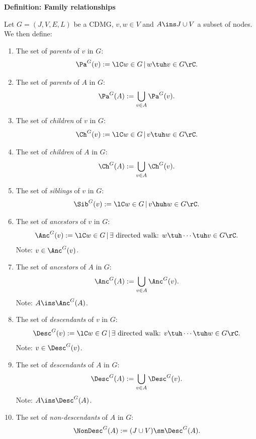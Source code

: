 \vspace{\appendixNotesGap}

\noindent\textbf{Definition: Family relationships}\par\smallskip
{\appendixTexSize
     Let $G=(J,V,E,L)$ be a CDMG, $v,w \in V$ and $A \ins J \cup V$ a subset of nodes.
     We then define:
     \begin{enumerate}
         \item The set of \emph{parents} of $v$ in $G$: \[\Pa^G(v):=\lC w \in G\,|\, w \tuh v \in G \rC.\]
         \item[] The set of \emph{parents} of $A$ in $G$: \[\Pa^G(A):= \bigcup_{v \in A} \Pa^G(v).\]
         \item The set of \emph{children} of $v$ in $G$: \[\Ch^G(v):=\lC w \in G\,|\, v \tuh w \in G \rC.\]
         \item[] The set of \emph{children} of $A$ in $G$: \[\Ch^G(A):= \bigcup_{v \in A} \Ch^G(v).\]
         \item The set of \emph{siblings} of $v$ in $G$: \[\Sib^G(v):=\lC w \in G\,|\, v \huh w \in G \rC.\]
         \item The set of \emph{ancestors} of $v$ in $G$: 
             \[\Anc^G(v):=\lC w \in G\,|\,\exists \text{ directed walk: } w \tuh \cdots \tuh v \in G \rC.\]
             Note: $v \in \Anc^G(v)$.
         \item[] The set of \emph{ancestors} of $A$ in $G$: \[\Anc^G(A):= \bigcup_{v \in A} \Anc^G(v).\]
             Note: $A \ins \Anc^G(A)$.
         \item The set of \emph{descendants} of $v$ in $G$: 
             \[\Desc^G(v):=\lC w \in G\,|\,\exists \text{ directed walk: } v \tuh \cdots \tuh w \in G \rC.\]
             Note: $v \in \Desc^G(v)$.
         \item[] The set of \emph{descendants} of $A$ in $G$: \[\Desc^G(A):= \bigcup_{v \in A} \Desc^G(v).\]
             Note: $A \ins \Desc^G(A)$.
         \item The set of \emph{non-descendants} of $A$ in $G$:
             \[ \NonDesc^G(A) := (J \cup V) \sm \Desc^G(A).\]

\end{enumerate}}
